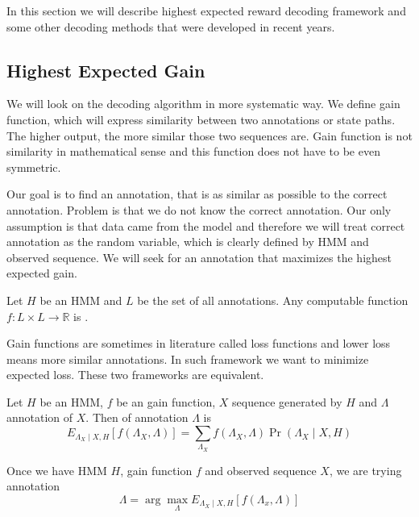 In this section we will describe highest expected reward decoding framework and
some other decoding methods that were developed in recent years.

\subsection{Highest Expected Gain}

We will look on the decoding algorithm in more systematic way. We define gain
function, which will express similarity between
two annotations or state paths. The higher output, the more
similar those two sequences are. Gain function is not similarity in mathematical
sense and this function does not have to be even symmetric. 

Our goal is to find an annotation, that is as similar as possible to the correct
annotation. Problem is that we do not know the correct annotation. Our only
assumption is that data came from the model and therefore we will treat correct
annotation as the random variable, which is clearly defined by HMM and observed
sequence. We will seek for an annotation that maximizes the highest expected
gain.

\begin{definition}
Let $H$ be an HMM and $L$ be the set of all annotations. Any computable function
$f:L\times L\to \mathbb{R}$ is .
\end{definition}

\begin{note}
Gain functions are sometimes in literature called loss functions and lower loss
means more similar annotations. In such framework we want to minimize expected
loss. These two frameworks are equivalent.
\end{note}

\begin{definition}
Let $H$ be an HMM, $f$ be an gain function, $X$ sequence generated by $H$ and
$\Lambda$ annotation of $X$. Then  of annotation
$\Lambda$ is 
\begin{equation}
E_{\Lambda_X\mid X,H}[f(\Lambda_X,\Lambda)] =
\sum_{\Lambda_X}f(\Lambda_X,\Lambda)\Pr\left(\Lambda_X\mid X,H\right)
\end{equation}
\end{definition}


Once we have HMM $H$, gain function $f$ and observed sequence $X$,
we are trying annotation
\begin{equation}
\Lambda = \arg\max_{\Lambda}E_{\Lambda_X\mid
X,H}\left[f\left(\Lambda_x,\Lambda\right)\right]
\end{equation}

